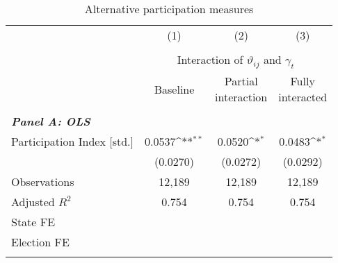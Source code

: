 \begin{table}[H]\centering
	\begin{threeparttable}
		\caption{Alternative participation measures}\label{tab_greta_cons:alternative_participation_measures}
		{\def\sym#1{\ifmmode^{#1}\else\(^{#1}\)\fi} 
			\begin{tabular}{l*{3}{c}}
				\toprule
				&\multicolumn{1}{c}{(1)}&\multicolumn{1}{c}{(2)}&\multicolumn{1}{c}{(3)}\\\\
				&\multicolumn{3}{c}{Interaction of $\vartheta_{ij}$ and $\gamma_t$}\\
				\cmidrule{2-4}
				& Baseline & \clb{c}{Partial\\interaction} & \clb{c}{Fully\\interacted} \\
				\midrule\\
				
				\multicolumn{4}{l}{\textbf{\textit{Panel A: OLS}}} \\
			Participation Index [std.]  &      0.0537\sym{**} &      0.0520\sym{*}  &      0.0483\sym{*}  \\  
										&    (0.0270)         &    (0.0272)         &    (0.0292)         \\  
				Observations      		&      12,189         &      12,189         &      12,189         \\  
				Adjusted $R^2$         	&       0.754         &       0.754         &       0.754         \\ 
				State FE				& \checkmark 		  & \checkmark       & \checkmark  \\
				Election FE				& \checkmark 		  & \checkmark       & \checkmark  \\
				\\ 
				

\end{tabular}}
\end{threeparttable}
\end{table}

